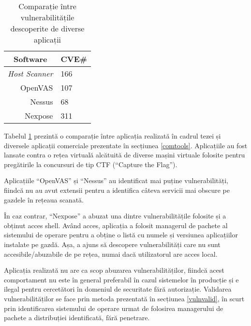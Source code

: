 	\begin{table}[H]
		\centering
		\begin{tabular}{|r|l|}
			\hline
			\multicolumn{1}{|c|}{\textbf{Software}} & \multicolumn{1}{c|}{\textbf{CVE\#}} \\ \hline
			\textit{Host Scanner\footnotemark{}}                   & 166                                 \\
			OpenVAS                                 & 107                                 \\
			Nessus                                  & 68                                  \\
			Nexpose                                 & 311                                 \\ \hline
		\end{tabular}
		\caption{Comparație între vulnerabilitățile descoperite de diverse aplicații}
		\label{foundvulns_ro}
	\end{table}
	
	Tabelul \ref{foundvulns_ro} prezintă o comparație între aplicația realizată în cadrul tezei și diversele aplicații comerciale prezentate în secțiunea \ref{comtools}. Aplicațiile au fost lansate contra o rețea virtuală alcătuită de diverse mașini virtuale folosite pentru pregătirile la concursuri de tip CTF (``Capture the Flag'').
	
	Aplicațiile ``OpenVAS'' și ``Nessus'' au identificat mai puține vulnerabilități, fiindcă nu au avut extensii pentru a identifica câteva servicii mai obscure pe gazdele în rețeaua scanată.
	
	În caz contrar, ``Nexpose'' a abuzat una dintre vulnerabilitățile folosite și a obținut acces shell. Având acces, aplicația a folosit managerul de pachete al sistemului de operare pentru a obține o listă cu numele și versiunea aplicațiilor instalate pe gazdă. Așa, a ajuns să descopere vulnerabilități care nu sunt accesibile/abuzabile de pe rețea, numai dacă utilizatorul are acces local.
	
	Aplicația realizată nu are ca scop abuzarea vulnerabilităților, fiindcă acest comportament nu este în general preferabil în cazul sistemelor în producție și e ilegal pentru cercetători în domeniul de securitate fără autorizație. Validarea vulnerabilităților se face prin metoda prezentată în secțiunea \ref{vulnvalid}, în scurt prin identificarea sistemului de operare urmat de folosirea managerului de pachete a distribuției identificată, fără penetrare.
